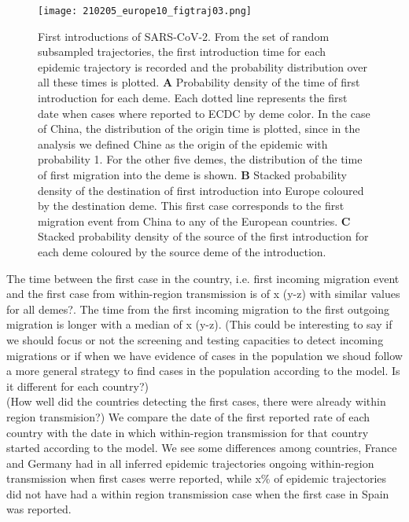 \begin{figure}[p]
    \centering
    \texttt{[image: 210205\_europe10\_figtraj03.png]}
    \caption{First introductions of SARS-CoV-2. From the set of random subsampled trajectories, the first introduction time for each epidemic trajectory is recorded and the probability distribution over all these times is plotted. \textbf{A} Probability density of the time of first introduction for each deme. Each dotted line represents the first date when cases where reported to ECDC by deme color. In the case of China, the distribution of the origin time is plotted, since in the analysis we defined Chine as the origin of the epidemic with probability 1. For the other five demes, the distribution of the time of first migration into the deme is shown. \textbf{B} Stacked probability density of the destination of first introduction into Europe coloured by the destination deme. This first case corresponds to the first migration event from China to any of the European countries. \textbf{C} Stacked probability density of the source of the first introduction for each deme coloured by the source deme of the introduction.}
    \label{fig:first}
\end{figure}


The time between the first case in the country, i.e. first incoming migration event and the first case from within-region transmission is of x  (y-z) with similar values for all demes?. The time from the first incoming migration to the first outgoing migration is longer with a median of x (y-z). (This could be interesting to say if we should focus or not the screening and testing capacities to detect incoming migrations or if when we have evidence of cases in the population we shoud follow a more general strategy to find cases in the population according to the model. Is it different for each country?)\\

(How well did the countries detecting the first cases, there were already within region transmision?) We compare the date of the first reported rate of each country with the date in which within-region transmission for that country started according to the model. We see some differences among countries, France and Germany had in all inferred epidemic trajectories ongoing within-region transmission when first cases werre reported, while x\% of epidemic trajectories did not have had a within region transmission case when the first case in Spain was reported.\\


